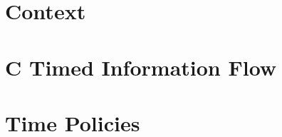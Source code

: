 %
%
%
%
%


\usetikzlibrary{arrows}
\pagestyle{empty} %
\listoftodos
\clearpage
{} %



\cleardoublepage
{}
\pagestyle{fancy} %
\tableofcontents

\cleardoublepage

\chapter{Context}







\chapter{C Timed Information Flow}




\chapter{Time Policies}






\printbibliography[heading=bibintoc]
\label{bib:mybiblio}


